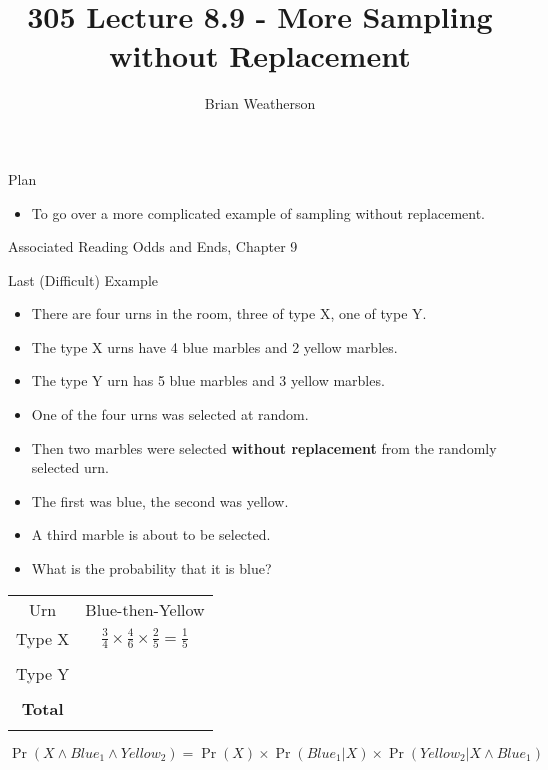 \documentclass[
  ignorenonframetext,
]{beamer}
\title{305 Lecture 8.9 - More Sampling without Replacement}
\author{Brian Weatherson}
\date{}
\providecommand{\tightlist}{%
  \setlength{\itemsep}{0pt}\setlength{\parskip}{0pt}}
\renewcommand{\,}{\text{, }}
\begin{document}
\frame{\titlepage}

\begin{frame}{Plan}
\protect\hypertarget{plan}{}
\begin{itemize}
\tightlist
\item
  To go over a more complicated example of sampling without replacement.
\end{itemize}
\end{frame}

\begin{frame}{Associated Reading}
\protect\hypertarget{associated-reading}{}
Odds and Ends, Chapter 9
\end{frame}

\begin{frame}{Last (Difficult) Example}
\protect\hypertarget{last-difficult-example}{}
\begin{itemize}
\tightlist
\item
  There are four urns in the room, three of type X, one of type Y.
\item
  The type X urns have 4 blue marbles and 2 yellow marbles.
\item
  The type Y urn has 5 blue marbles and 3 yellow marbles.
\item
  One of the four urns was selected at random.
\item
  Then two marbles were selected \textbf{without replacement} from the
  randomly selected urn.
\item
  The first was blue, the second was yellow.
\item
  A third marble is about to be selected.
\item
  What is the probability that it is blue?
\end{itemize}
\end{frame}

\begin{frame}
\begin{longtable}[]{@{}cc@{}}
\toprule
Urn & Blue-then-Yellow \\ \addlinespace
\midrule
\endhead
Type X &
\(\frac{3}{4} \times \frac{4}{6} \times \frac{2}{5} = \frac{1}{5}\) \\ \addlinespace
& \\ \addlinespace
Type Y & \\ \addlinespace
& \\ \addlinespace
\textbf{Total} & \\ \addlinespace
\bottomrule
\end{longtable}

\[
\Pr(X \wedge Blue_1 \wedge Yellow_2) = \Pr(X) \times \Pr(Blue_1 | X) \times \Pr(Yellow_2 | X \wedge Blue_1)
\]
\end{frame}
\end{document}
